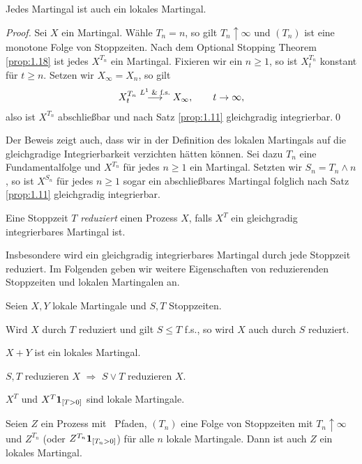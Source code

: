 \begin{lem*}
Jedes Martingal ist auch ein lokales Martingal.\fish
\end{lem*}
\begin{proof}
Sei $X$ ein Martingal. Wähle $T_n = n$, so gilt $T_n\uparrow \infty$ und 
$(T_n)$ ist eine monotone Folge von Stoppzeiten. Nach dem Optional Stopping
Theorem \ref{prop:1.18} ist jedes $X^{T_n}$ ein Martingal.
Fixieren wir ein $n\ge 1$, so ist  $X^{T_n}_t$ konstant für $t\ge n$. Setzen wir
$X_\infty = X_n$, so gilt
\begin{align*}
X_t^{T_n}\overset{L^1\text{ \& f.s.}}{\longrightarrow} X_\infty,\qquad t\to\infty,
\end{align*}
also ist $X^{T_n}$ abschließbar und nach Satz \ref{prop:1.11} gleichgradig
integrierbar.\qed
\end{proof}

\begin{rem*}
Der Beweis zeigt auch, dass wir in der Definition des lokalen Martingals auf die
gleichgradige Integrierbarkeit verzichten hätten können. Sei dazu $T_n$
eine Fundamentalfolge und $X^{T_n}$ für jedes $n\ge 1$ ein Martingal. Setzten
wir $S_n = T_n\wedge n$, so ist $X^{S_n}$ für jedes $n\ge 1$ 
sogar ein abschließbares Martingal folglich nach Satz \ref{prop:1.11}
gleichgradig integrierbar.\map
\end{rem*}



\begin{defn}
\label{defn:1.18}
Eine Stoppzeit $T$ \emph{reduziert} einen Prozess $X$, falls $X^T$
ein gleichgradig integrierbares Martingal ist.\fish
\end{defn}

Insbesondere wird ein gleichgradig integrierbares Martingal durch jede
Stoppzeit reduziert. Im Folgenden geben wir weitere Eigenschaften von
reduzierenden Stoppzeiten und lokalen Martingalen an.

\begin{prop}
\label{prop:1.29}
Seien $X,Y$ lokale Martingale und $S,T$ Stoppzeiten.
\begin{propenum}
\item Wird $X$ durch $T$ reduziert und gilt $S\le T$ f.s., so wird
  $X$ auch durch $S$ reduziert.
\item $X+Y$ ist ein lokales Martingal.
\item $S,T$ reduzieren $X$ $\Rightarrow$ $S\vee T$ reduzieren $X$.
\item $X^T$ und $X^T\mathbf{1}_{[T>0]}$ sind lokale Martingale.
\item Seien $Z$ ein Prozess mit \cadlag\ Pfaden, $(T_n)$ eine Folge von
  Stoppzeiten mit $T_n \uparrow \infty$ und $Z^{T_n}$ (oder
  $Z^{T_n}\mathbf{1}_{[T_n>0]}$) für alle $n$ lokale Martingale. Dann ist auch $Z$ ein
  lokales Martingal.\fish
\end{propenum}
\end{prop}

